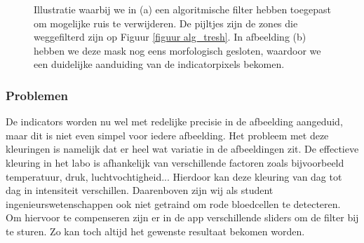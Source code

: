 \documentclass[a4paper,kulak]{kulakarticle}
\begin{document}
\begin{figure}[H]
	\centering
	\qquad
	
	\caption{Illustratie waarbij we in (a) een algoritmische filter hebben toegepast om mogelijke ruis te verwijderen. De pijltjes zijn de zones die weggefilterd zijn op Figuur \ref{figuur alg_tresh}. In afbeelding (b) hebben we deze mask nog eens morfologisch gesloten, waardoor we een duidelijke aanduiding van de indicatorpixels bekomen.}
	\label{figuur morf}
\end{figure}

\subsubsection{Problemen}
De indicators worden nu wel met redelijke precisie in de afbeelding aangeduid, maar dit is niet even simpel voor iedere afbeelding.
Het probleem met deze kleuringen is namelijk dat er heel wat variatie in de afbeeldingen zit. De effectieve kleuring in het labo is afhankelijk van verschillende factoren zoals bijvoorbeeld temperatuur, druk, luchtvochtigheid... Hierdoor kan deze kleuring van dag tot dag in intensiteit verschillen. Daarenboven zijn wij als student ingenieurswetenschappen ook niet getraind om rode bloedcellen te detecteren. Om hiervoor te compenseren zijn er in de app verschillende sliders om de filter bij te sturen. Zo kan toch altijd het gewenste resultaat bekomen worden.
\end{document}
